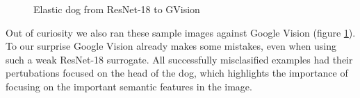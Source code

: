 \begin{figure}
 \hfill
 \hfill

 \hfill

\caption{Elastic dog from ResNet-18 to GVision}
\label{fig:elastic_dog_gvision}
\end{figure}


Out of curiosity we also ran these sample images against Google Vision (figure \ref{fig:elastic_dog_gvision}). To our surprise Google Vision already makes some mistakes, even when using such a weak ResNet-18 surrogate. All successfully misclasified examples had their pertubations focused on the head of the dog, which highlights the importance of focusing on the important semantic features in the image.


